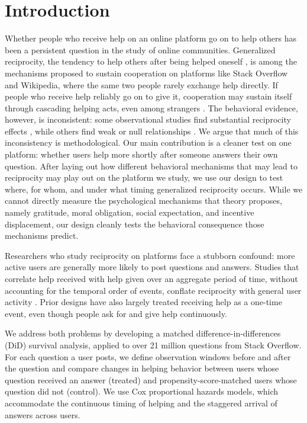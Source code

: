 \section{Introduction}

Whether people who receive help on an online platform go on to help others has been a persistent question in the study of online communities. Generalized reciprocity, the tendency to help others after being helped oneself \citep{nowak_upstream_2007, baker_paying_2014}, is among the mechanisms proposed to sustain cooperation on platforms like Stack Overflow and Wikipedia, where the same two people rarely exchange help directly. If people who receive help reliably go on to give it, cooperation may sustain itself through cascading helping acts, even among strangers \citep{fowler_cooperative_2010}. The behavioral evidence, however, is inconsistent: some observational studies find substantial reciprocity effects \citep{baker_paying_2014, chen_why_2019}, while others find weak or null relationships \citep{wasko_why_2005, joyce_predicting_2006}. We argue that much of this inconsistency is methodological. Our main contribution is a cleaner test on one platform: whether users help more shortly after someone answers their own question. After laying out how different behavioral mechanisms that may lead to reciprocity may play out on the platform we study, we use our design to test where, for whom, and under what timing generalized reciprocity occurs. While we cannot directly measure the psychological mechanisms that theory proposes, namely gratitude, moral obligation, social expectation, and incentive displacement, our design cleanly tests the behavioral consequence those mechanisms predict.

Researchers who study reciprocity on platforms face a stubborn confound: more active users are generally more likely to post questions and answers. Studies that correlate help received with help given over an aggregate period of time, without accounting for the temporal order of events, conflate reciprocity with general user activity \citep{baker_paying_2014, chen_engaging_2018, joyce_predicting_2006}. Prior designs have also largely treated receiving help as a one-time event, even though people ask for and give help continuously.

We address both problems by developing a matched difference-in-differences (DiD) survival analysis, applied to over 21 million questions from Stack Overflow. For each question a user posts, we define observation windows before and after the question and compare changes in helping behavior between users whose question received an answer (treated) and propensity-score-matched users whose question did not (control). We use Cox proportional hazards models, which accommodate the continuous timing of helping and the staggered arrival of answers across users.

